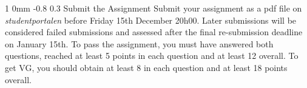 \documentclass[11pt]{article}
\makeatletter
\renewcommand{\section}{\@startsection
{section}%
{1}%
{0mm}%
{-0.8\baselineskip}%
{0.3\baselineskip}%
{\bfseries\large}}%
\makeatother
\begin{document}
\section{Submit the Assignment}
\noindent
Submit your assignment as a pdf file on \textit{studentportalen}
before Friday 15th December 20h00. Later submissions will be
considered failed submissions and assessed after the final
re-submission deadline on January 15th. To pass the assignment, you
must have answered both questions, reached at least 5 points in each
question and at least 12 overall.  To get VG, you should obtain at
least 8 in each question and at least 18 points overall.
  
\end{document}
